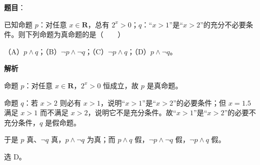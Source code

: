 \begin{answer}

\textbf{题目}：

已知命题 $p$：对任意 $x\in\mathbf R$，总有 $2^x>0$；$q$：“$x>1$”是“$x>2$”的充分不必要条件。则下列命题为真命题的是\mbox{（　　）}

（A）$p\wedge q$；（B）$\neg p\wedge\neg q$；（C）$\neg p\wedge q$；（D）$p\wedge\neg q$。

\textbf{解析}

命题 $p$：对任意 $x\in\mathbf R$，$2^x>0$ 恒成立，故 $p$ 是真命题。

命题 $q$：若 $x>2$ 则必有 $x>1$，说明“$x>1$”是“$x>2$”的必要条件；但 $x=1.5$ 满足 $x>1$ 而不满足 $x>2$，说明它不是充分条件。故“$x>1$”是“$x>2$”的必要不充分条件，$q$ 是假命题。

于是 $p$ 真、$\neg q$ 真，$p\wedge\neg q$ 为真；而 $p\wedge q$ 假，$\neg p\wedge\neg q$ 假，$\neg p\wedge q$ 假。

选 D。


\end{answer}
